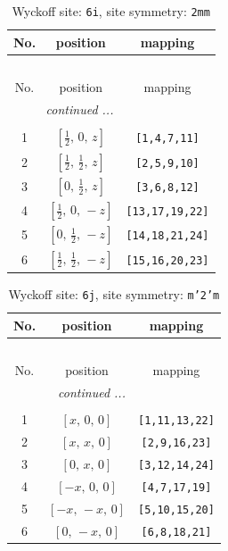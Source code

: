 \documentclass[fleqn,8pt]{jsarticle}
\begin{document}
\renewcommand{\arraystretch}{1.2}
\begin{longtable}{ccc}
\caption{Wyckoff site: {\tt 6i}, site symmetry: {\tt 2mm}}
 \\
 \hline \hline
No. & position & mapping \\ \hline \endfirsthead

\multicolumn{2}{l}{\tablename\ \thetable{}} \\
 \hline \hline
No. & position & mapping \\ \hline \endhead

 \hline \hline
\multicolumn{2}{r}{\footnotesize\it continued ...} \\ \endfoot

 \hline \hline
\multicolumn{2}{r}{} \\ \endlastfoot

1 & $\left[ \frac{1}{2},\, 0,\, z \right]$ & {\tt [1,4,7,11]} \\ \hline
2 & $\left[ \frac{1}{2},\, \frac{1}{2},\, z \right]$ & {\tt [2,5,9,10]} \\ \hline
3 & $\left[ 0,\, \frac{1}{2},\, z \right]$ & {\tt [3,6,8,12]} \\ \hline
4 & $\left[ \frac{1}{2},\, 0,\, - z \right]$ & {\tt [13,17,19,22]} \\ \hline
5 & $\left[ 0,\, \frac{1}{2},\, - z \right]$ & {\tt [14,18,21,24]} \\ \hline
6 & $\left[ \frac{1}{2},\, \frac{1}{2},\, - z \right]$ & {\tt [15,16,20,23]} \\
\end{longtable}
\renewcommand{\arraystretch}{1.2}
\begin{longtable}{ccc}
\caption{Wyckoff site: {\tt 6j}, site symmetry: {\tt m'2'm}}
 \\
 \hline \hline
No. & position & mapping \\ \hline \endfirsthead

\multicolumn{2}{l}{\tablename\ \thetable{}} \\
 \hline \hline
No. & position & mapping \\ \hline \endhead

 \hline \hline
\multicolumn{2}{r}{\footnotesize\it continued ...} \\ \endfoot

 \hline \hline
\multicolumn{2}{r}{} \\ \endlastfoot

1 & $\left[ x,\, 0,\, 0 \right]$ & {\tt [1,11,13,22]} \\ \hline
2 & $\left[ x,\, x,\, 0 \right]$ & {\tt [2,9,16,23]} \\ \hline
3 & $\left[ 0,\, x,\, 0 \right]$ & {\tt [3,12,14,24]} \\ \hline
4 & $\left[ - x,\, 0,\, 0 \right]$ & {\tt [4,7,17,19]} \\ \hline
5 & $\left[ - x,\, - x,\, 0 \right]$ & {\tt [5,10,15,20]} \\ \hline
6 & $\left[ 0,\, - x,\, 0 \right]$ & {\tt [6,8,18,21]} \\
\end{longtable}
\end{document}
